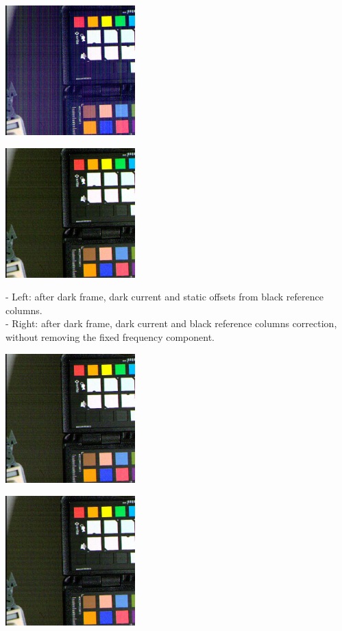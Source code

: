{\begin{center}
\includegraphics[height=5cm]{images/10ms+4-totally-raw-crop}
\end{center}

\begin{center}
\includegraphics[height=5cm]{images/10ms+4-no-blackcol-crop}
\end{center}

- Left: after dark frame, dark current and static offsets from black reference columns.\\
- Right: after dark frame, dark current and black reference columns correction, without removing the fixed frequency component.\\

 \begin{center}
\includegraphics[height=5cm]{images/10ms+4-no-blackcol-rn-crop}
\end{center}

\begin{center}
\includegraphics[height=5cm]{images/10ms+4-no-blackcol-ff-crop}
\end{center}

}
